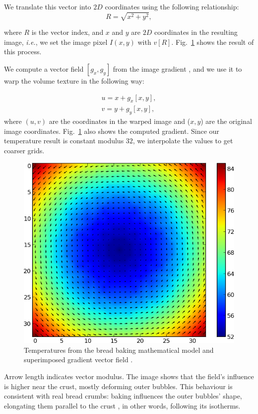 \documentclass[final,5p,times]{elsarticle}
\begin{document}
We translate this vector into $2D$ coordinates using the following relationship:
\begin{equation}
R = \sqrt{x^{2}+y^{2}},
\end{equation}


\noindent where $R$ is the vector index, and $x$ and $y$ are $2D$ coordinates in the resulting image, {\em i.e.}, we set the image pixel $I(x,y)$ with $v[R]$. Fig.~\ref{FigBakingVectorField} shows the result of this process.

We compute a vector field $[g_{x},g_{y}]$ from the image gradient \cite{Gonzalez2006}, and we use it to warp the volume texture in the following way:

\begin{align}
u = x+g_{x}[x,y],\\
v = y+g_{y}[x,y],
\end{align}
\noindent where $(u,v)$ are the coordinates in the warped image and ($x,y$) are the original image coordinates. Fig.~\ref{FigBakingVectorField} also shows the computed gradient. Since our temperature result is constant modulus $32$, we interpolate the values to get coarser grids.


\begin{figure}
\includegraphics[scale=0.58]{vfield.png}
\caption{Temperatures from the bread baking mathematical model and superimposed gradient vector field .}
\label{FigBakingVectorField}
\end{figure}

Arrow length indicates vector modulus. The image shows that the field's influence is higher near the crust, mostly deforming outer bubbles. This behaviour is consistent with real bread crumbs: baking influences the outer bubbles' shape, elongating them parallel to the crust \cite{Scanlon2001}, in other words, following its isotherms.
\end{document}
